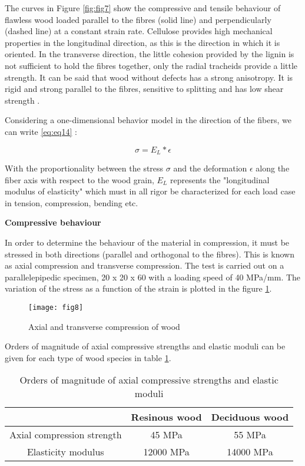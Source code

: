 The curves in Figure \ref{fig:fig7} show the compressive and tensile behaviour of flawless wood loaded parallel to the fibres (solid line) and perpendicularly (dashed line) at a constant strain rate. Cellulose provides high mechanical properties in the longitudinal direction, as this is the direction in which it is oriented. In the transverse direction, the little cohesion provided by the lignin is not sufficient to hold the fibres together, only the radial tracheids provide a little strength. It can be said that wood without defects has a strong anisotropy. It is rigid and strong parallel to the fibres, sensitive to splitting and has low shear strength \cite{Taazount2021}.

Considering a one-dimensional behavior model in the direction of the fibers, we can write \ref{eq:eq14} :

\begin{equation}
	\sigma = E_{L}*\epsilon
	\label{eq:eq14}
\end{equation}

With the proportionality between the stress $\sigma$ and the deformation $\epsilon$ along the fiber axis with respect to the wood grain, $ E_L $ represents the "longitudinal modulus of elasticity" which must in all rigor be characterized for each load case in tension, compression, bending etc.


\textbf{Compressive behaviour}

In order to determine the behaviour of the material in compression, it must be stressed in both directions (parallel and orthogonal to the fibres). This is known as axial compression and transverse compression. The test is carried out on a parallelepipedic specimen, 20 x 20 x 60  with a loading speed of 40 MPa/mm. The variation of the stress as a function of the strain is plotted in the figure \ref{fig:fig8}.


\begin{figure}[htp]
	\centering
	\texttt{[image: fig8]}
	\caption{Axial and transverse compression of wood}
	\label{fig:fig8}
\end{figure}

Orders of magnitude of axial compressive strengths and elastic moduli can be given for each type of wood species in table \ref{fig:fig9}. 

\begin{table} \centering
	\begin{tabular}{ccc}
		\toprule %
		& Resinous wood & Deciduous wood  \\\midrule
		Axial compression strength & 45 \unit{\mega\pascal}
		& 55 \unit{\mega\pascal} \\\midrule
		Elasticity modulus & 12000 \unit{\mega\pascal}
		& 14000 \unit{\mega\pascal} \\
		\bottomrule %
	\end{tabular}
	\caption{Orders of magnitude of axial compressive strengths and elastic moduli}
	\label{fig:fig9}
\end{table}


